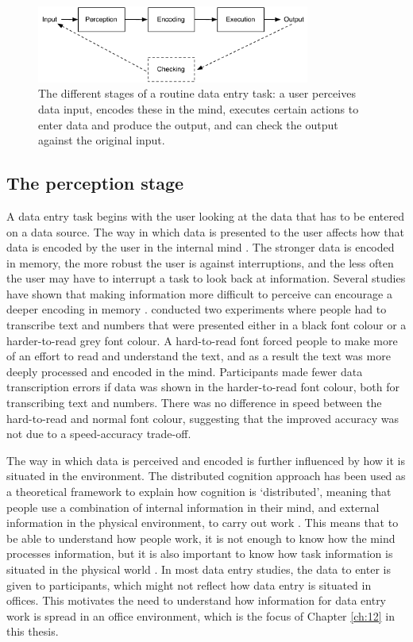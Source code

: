 \begin{figure}[!ht]
\centering
\includegraphics[width=0.8\textwidth]{images/background/HIP.pdf}
\caption[Different stages of a data entry task]{The different stages of a routine data entry task: a user perceives data input, encodes these in the mind, executes certain actions to enter data and produce the output, and can check the output against the original input.}
\vspace{-3pt}
\label{fig:ch2_hip}
\end{figure}


\subsection{The perception stage}
A data entry task begins with the user looking at the data that has to be entered on a data source.  The way in which data is presented to the user affects how that data is encoded by the user in the internal mind \citep{Hollan2000, Hutchins1995}. The stronger data is encoded in memory, the more robust the user is against interruptions, and the less often the user may have to interrupt a task to look back at information. Several studies have shown that making information more difficult to perceive can encourage a deeper encoding in memory \citep{Diemand-Yauman2011, Soboczenski2013}.
\citet{Soboczenski2013} conducted two experiments where people had to transcribe text and numbers that were presented either in a black font colour or a harder-to-read grey font colour. A hard-to-read font forced people to make more of an effort to read and understand the text, and as a result the text was more deeply processed and encoded in the mind. Participants made fewer data transcription errors if data was shown in the harder-to-read font colour, both for transcribing text and numbers. There was no difference in speed between the hard-to-read and normal font colour, suggesting that the improved accuracy was not due to a speed-accuracy trade-off. 

The way in which data is perceived and encoded is further influenced by how it is situated in the environment. The distributed cognition approach has been used as a theoretical framework to explain how cognition is ‘distributed’, meaning that people use a combination of internal information in their mind, and external information in the physical environment, to carry out work \citep{Hollan2000, Hutchins1995}. This means that to be able to understand how people work, it is not enough to know how the mind processes information, but it is also important to know how task information is situated in the physical world \citep{Hollan2000}. In most data entry studies, the data to enter is given to participants, which might not reflect how data entry is situated in offices. This motivates the need to understand how information for data entry work is spread in an office environment, which is the focus of Chapter \ref{ch:12} in this thesis. 

